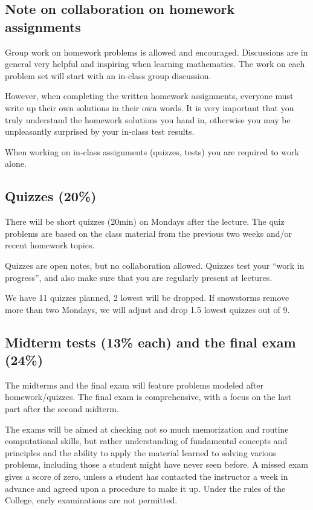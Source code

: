 \documentclass[oneside,11pt]{amsart}
\begin{document}
\subsection*{Note on collaboration on homework assignments}
\label{collaboration}

Group work on homework problems is allowed and encouraged.
Discussions are in general very
helpful and inspiring when learning mathematics.
The work on each problem set will start with an in-class group discussion.

However, when completing the written homework assignments, everyone must write up their own
solutions in their own words.
It is very important that you truly understand the homework solutions you hand
in, otherwise you may be unpleasantly surprised by your in-class test results.

When working on in-class assignments (quizzes, tests)
you are required to work alone.

\subsection{Quizzes (20\%)}

There will be short quizzes (20min) on Mondays after the lecture.
The quiz problems are based on the class material from the previous two weeks
and/or recent homework topics.

Quizzes are open notes, but no collaboration allowed.
Quizzes test your ``work in progress'', and also make sure that you are regularly present at lectures.

We have 11 quizzes planned, 2 lowest will be dropped. If snowstorms remove more than two Mondays, 
we will adjust and drop 1.5 lowest quizzes out of 9.

\subsection{Midterm tests (13\% each) and the final exam (24\%)}

The midterms and the final exam will feature
problems modeled after homework/quizzes.
The final exam is comprehensive, with a focus on the last part
after the second midterm.

The exams will be aimed at checking not so much memorization and
routine computational skills, but rather understanding of fundamental
concepts and principles and the ability to apply the material
learned to solving various problems, including those a student might
have never seen before. A missed exam gives a score of zero, unless a
student has contacted the instructor a week in advance and agreed upon a
procedure to make it up. Under the rules of
the College, early examinations are not permitted.
\end{document}
